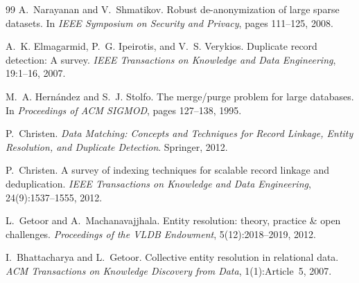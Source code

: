 \documentclass[11pt]{article}
\newcommand{\1}{\mathbf{1}}
\theoremstyle{plain}
\theoremstyle{definition}
\begin{document}
\begin{thebibliography}{99}
A.~Narayanan and V.~Shmatikov.
\newblock Robust de-anonymization of large sparse datasets.
\newblock In \emph{IEEE Symposium on Security and Privacy}, pages 111--125, 2008.

A.~K. Elmagarmid, P.~G. Ipeirotis, and V.~S. Verykios.
\newblock Duplicate record detection: A survey.
\newblock \emph{IEEE Transactions on Knowledge and Data Engineering}, 19:1--16, 2007.

M.~A. Hern{\'a}ndez and S.~J. Stolfo.
\newblock The merge/purge problem for large databases.
\newblock In \emph{Proceedings of ACM SIGMOD}, pages 127--138, 1995.

P.~Christen.
\newblock \emph{Data Matching: Concepts and Techniques for Record Linkage, Entity Resolution, and Duplicate Detection}.
\newblock Springer, 2012.

P.~Christen.
\newblock A survey of indexing techniques for scalable record linkage and deduplication.
\newblock \emph{IEEE Transactions on Knowledge and Data Engineering}, 24(9):1537--1555, 2012.

L.~Getoor and A.~Machanavajjhala.
\newblock Entity resolution: theory, practice \& open challenges.
\newblock \emph{Proceedings of the VLDB Endowment}, 5(12):2018--2019, 2012.

I.~Bhattacharya and L.~Getoor.
\newblock Collective entity resolution in relational data.
\newblock \emph{ACM Transactions on Knowledge Discovery from Data}, 1(1):Article~5, 2007.

\end{thebibliography}
\end{document}
